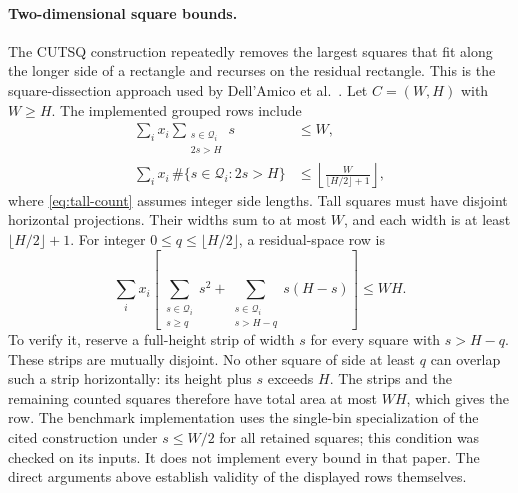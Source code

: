 \paragraph{Two-dimensional square bounds.}
The CUTSQ construction repeatedly removes the largest squares that
fit along the longer side of a rectangle and recurses on the residual
rectangle. This is the square-dissection approach used by
Dell'Amico et al.~\cite{DellAmicoEtAl2002}. Let $C=(W,H)$ with $W\geq H$.
The implemented grouped rows include
\begin{align}
 \sum_i x_i\sum_{\substack{s\in\mathcal Q_i\\2s>H}}s&\leq W,
                                                               \label{eq:tall-width}\\
 \sum_i x_i\,\#\{s\in\mathcal Q_i:2s>H\}
    &\leq\left\lfloor\frac{W}{\lfloor H/2\rfloor+1}\right\rfloor,
                                                               \label{eq:tall-count}
\end{align}
where \eqref{eq:tall-count} assumes integer side lengths. Tall squares
must have disjoint horizontal projections. Their widths sum to at
most $W$, and each width is at least $\lfloor H/2\rfloor+1$.
For integer $0\leq q\leq\lfloor H/2\rfloor$, a residual-space row is
\begin{equation}
 \sum_i x_i\left[
    \sum_{\substack{s\in\mathcal Q_i\\s\geq q}}s^2
   +\sum_{\substack{s\in\mathcal Q_i\\s>H-q}}s(H-s)
             \right]\leq WH.                                 \label{eq:residual}
\end{equation}
To verify it, reserve a full-height strip of width $s$ for every
square with $s>H-q$. These strips are mutually disjoint. No other
square of side at least $q$ can overlap such a strip horizontally:
its height plus $s$ exceeds $H$. The strips and the remaining counted
squares therefore have total area at most $WH$, which gives the row.
The benchmark implementation uses the single-bin specialization of
the cited construction under $s\leq W/2$ for all retained squares;
this condition was checked on its inputs. It does not implement every
bound in that paper. The direct arguments above establish validity
of the displayed rows themselves.

